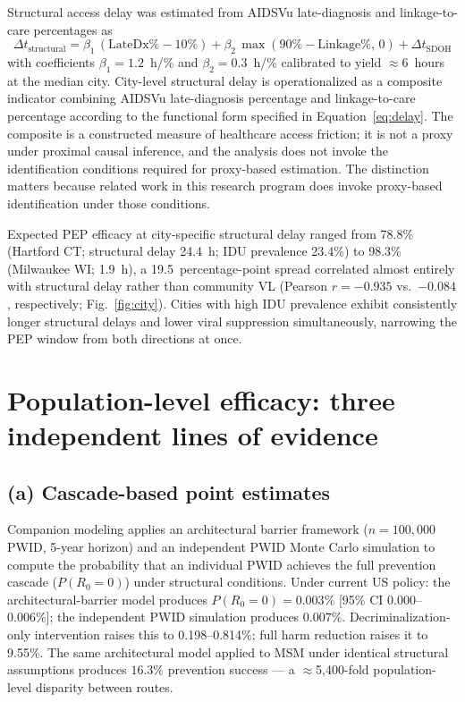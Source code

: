\documentclass[11pt]{article}
\theoremstyle{definition}
\theoremstyle{remark}
\begin{document}
Structural access delay was estimated from AIDSVu late-diagnosis and linkage-to-care percentages as
\begin{equation}
\Delta t_{\text{structural}} = \beta_{1}\,(\text{LateDx}\% - 10\%) + \beta_{2}\,\max(90\% - \text{Linkage}\%,\, 0) + \Delta t_{\text{SDOH}}
\label{eq:delay}
\end{equation}
with coefficients $\beta_{1} = 1.2$~h/\% and $\beta_{2} = 0.3$~h/\% calibrated to yield $\approx$6~hours at the median city. City-level structural delay is operationalized as a composite indicator combining AIDSVu late-diagnosis percentage and linkage-to-care percentage according to the functional form specified in Equation~\ref{eq:delay}. The composite is a constructed measure of healthcare access friction; it is not a proxy under proximal causal inference\cite{tchetgentchetgen2020}, and the analysis does not invoke the identification conditions required for proxy-based estimation\cite{pearl2009}. The distinction matters because related work in this research program does invoke proxy-based identification under those conditions.

Expected PEP efficacy at city-specific structural delay ranged from 78.8\% (Hartford CT; structural delay 24.4~h; IDU prevalence 23.4\%) to 98.3\% (Milwaukee WI; 1.9~h), a 19.5~percentage-point spread correlated almost entirely with structural delay rather than community VL (Pearson $r = -0.935$ vs.\ $-0.084$, respectively; Fig.~\ref{fig:city}). Cities with high IDU prevalence exhibit consistently longer structural delays and lower viral suppression simultaneously, narrowing the PEP window from both directions at once.

\section*{Population-level efficacy: three independent lines of evidence}

\subsection*{(a) Cascade-based point estimates}

Companion modeling\cite{demidont_companion} applies an architectural barrier framework ($n = 100{,}000$ PWID, 5-year horizon) and an independent PWID Monte Carlo simulation to compute the probability that an individual PWID achieves the full prevention cascade ($P(R_{0}=0)$) under structural conditions. Under current US policy: the architectural-barrier model produces $P(R_{0}=0) = 0.003\%$ [95\% CI 0.000--0.006\%]; the independent PWID simulation produces $0.007\%$. Decriminalization-only intervention raises this to 0.198--0.814\%; full harm reduction raises it to 9.55\%. The same architectural model applied to MSM under identical structural assumptions produces $16.3\%$ prevention success --- a $\approx$5{,}400-fold population-level disparity between routes.
\end{document}
